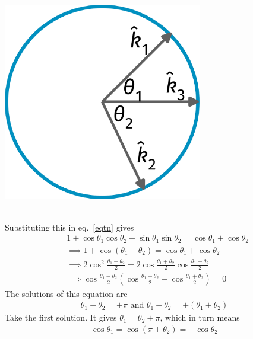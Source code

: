 \documentclass{article}
\begin{document}
\begin{minipage}{0.35\textwidth}
	\centering
	\includegraphics[width=0.65\textwidth]{./figures/term2.pdf}
\end{minipage}\\
Substituting this in eq.~\ref{eqtn} gives
\begin{equation}\begin{aligned}
 &1 + \cos\theta_1\cos\theta_2 + \sin\theta_1\sin\theta_2= \cos\theta_1 + \cos\theta_2\\
 &\implies  1 + \cos\left(\theta_1 - \theta_2\right) = \cos\theta_1 + \cos\theta_2\\
 &\implies  2\cos^2\frac{\theta_1 - \theta_2}{2} = 2\cos\frac{\theta_1 + \theta_2}{2}\cos\frac{\theta_1 - \theta_2}{2}\\
 &\implies  \cos\frac{\theta_1 - \theta_2}{2}\left(\cos\frac{\theta_1 - \theta_2}{2} - \cos\frac{\theta_1 + \theta_2}{2}\right) =0
\end{aligned}\end{equation}
The solutions of this equation are
\begin{equation}\begin{aligned}
	\theta_1 - \theta_2 = \pm \pi \text{ and } \theta_1 - \theta_2 = \pm\left(\theta_1 + \theta_2\right)
\end{aligned}\end{equation}
Take the first solution. It gives \(\theta_1 = \theta_2 \pm \pi\), which in turn means
\begin{equation}\begin{aligned}
\label{cos}
\cos \theta_1 = \cos \left(\pi \pm \theta_2\right) = -\cos \theta_2
\end{aligned}\end{equation}
\end{document}
